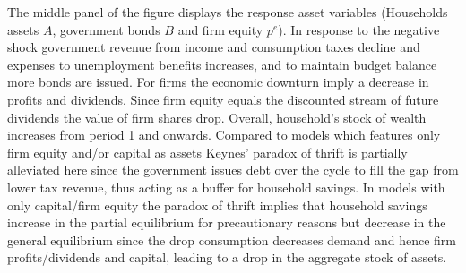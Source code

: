 The middle panel of the figure displays the response asset variables (Households assets $A$, government bonds $B$ and firm equity $p^e$). In response to the negative shock government revenue from income and consumption taxes decline and expenses to unemployment benefits increases, 
and to maintain budget balance more bonds are issued. 
For firms the economic downturn imply a decrease in profits and dividends. Since firm equity equals the discounted stream of future dividends the value of firm shares drop. Overall, household's stock of wealth increases from period 1 and onwards. Compared to models which features only firm equity and/or capital as assets Keynes' paradox of thrift is partially alleviated here since the government issues debt over the cycle to fill the gap from lower tax revenue, thus acting as a buffer for household savings. In models with only capital/firm equity the paradox of thrift implies that household savings increase in the partial equilibrium for precautionary reasons but decrease in the general equilibrium since the drop consumption decreases demand and hence firm profits/dividends and capital, leading to a drop in the aggregate stock of assets. 







